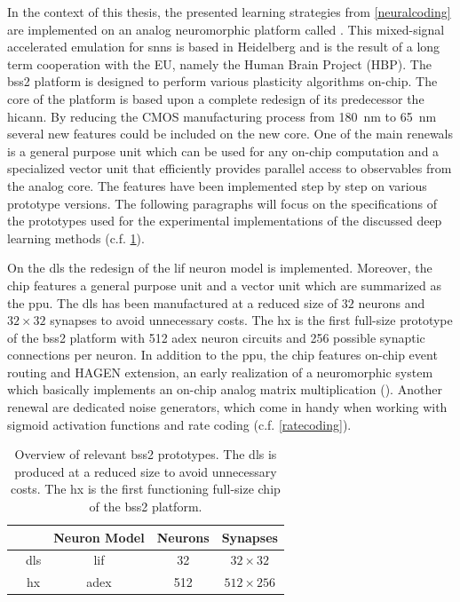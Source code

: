 In the context of this thesis, the presented learning strategies from \cref{neuralcoding} are implemented on an analog neuromorphic platform called . This mixed-signal accelerated emulation for \glspl{snn} is based in Heidelberg and is the result of a long term cooperation with the EU, namely the Human Brain Project (HBP).
%
The \gls{bss2} platform is designed to perform various plasticity algorithms on-chip. The core of the platform is based upon a complete redesign of its predecessor the \gls{hicann}. By reducing the CMOS manufacturing process from \SI{180}{\nano \m} to \SI{65}{\nano \m} several new features could be included on the new core. One of the main renewals is a general purpose unit which can be used for any on-chip computation and a specialized vector unit that efficiently provides parallel access to observables from the analog core. The features have been implemented step by step on various prototype versions. The following paragraphs will focus on the specifications of the prototypes used for the experimental implementations of the discussed deep learning methods (c.f. \cref{bss2prototypes}).

On the \gls{dls} the redesign of the \gls{lif} neuron model is implemented. Moreover, the chip features a general purpose unit and a vector unit which are summarized as the \gls{ppu}. The \gls{dls} has been manufactured at a reduced size of $32$ neurons and $32 \times 32$ synapses to avoid unnecessary costs. The \gls{hx} is the first full-size prototype of the \gls{bss2} platform with 512 \gls{adex} neuron circuits and 256 possible synaptic connections per neuron. In addition to the \gls{ppu}, the chip features on-chip event routing and HAGEN extension, an early realization of a neuromorphic system which basically implements an on-chip analog matrix multiplication (\citealp{schemmel2020accelerated}). Another renewal are dedicated noise generators, which come in handy when working with sigmoid activation functions and rate coding (c.f. \cref{ratecoding}).

\begin{table}[t!]\centering{}
	\begin{tabular}{@{}rcccc@{}}\toprule
		& 					& Neuron Model	& Neurons 	& Synapses 	\\ \midrule
		& \acrshort{dls}	& \gls{lif}		& 32 		& $32 \times 32$	\\
		& \acrshort{hx}		& \gls{adex}	& 512	 	& $512 \times 256$	\\
		\bottomrule
	\end{tabular}
	\caption[Overview of relevant \gls{bss2} prototypes.]{Overview of relevant \gls{bss2} prototypes. The \acrshort{dls} is produced at a reduced size to avoid unnecessary costs. The \acrshort{hx} is the first functioning full-size chip of the \gls{bss2} platform.}
	\label{bss2prototypes}
\end{table}

